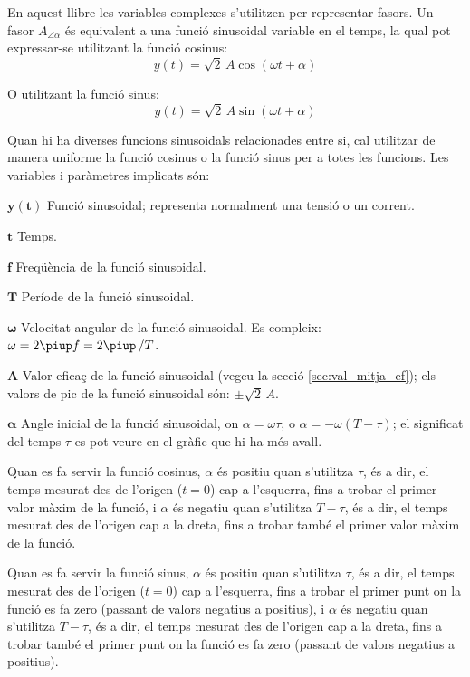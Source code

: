 \pagebreak

En aquest llibre les variables complexes s'utilitzen per representar fasors. Un fasor $A_{\angle \alpha}$ és equivalent a una funció sinusoidal variable en el temps, la qual pot expressar-se utilitzant la funció cosinus:
\[y(t)=\sqrt{2}\, A \cos(\omega t + \alpha)\]

O utilitzant la funció sinus:
\[y(t)=\sqrt{2}\, A \sin(\omega t + \alpha)\]

Quan hi ha diverses funcions sinusoidals relacionades entre si, cal utilitzar de manera uniforme la funció cosinus o la funció sinus per a totes les funcions. Les variables i paràmetres implicats són:
\begin{list}{}
{\setlength{\labelwidth}{15mm} \setlength{\leftmargin}{20mm}
\setlength{\labelsep}{5mm}}
    \item[$\boldsymbol{y(t)}$] Funció sinusoidal; representa normalment una tensió o un corrent.
    \item[$\boldsymbol{t}$] Temps.
    \item[$\boldsymbol{f}$] Freqüència de la funció sinusoidal.
    \item[$\boldsymbol{T}$] Període de la funció sinusoidal.
    \item[$\boldsymbol{\omega}$] Velocitat angular de la funció sinusoidal. Es compleix: $\omega = 2 \piup f = 2 \piup\,/T$.
    \item[$\boldsymbol{A}$] Valor eficaç de la funció sinusoidal (vegeu la secció \vref{sec:val_mitja_ef}); els valors de pic de la funció sinusoidal  són:  $\pm\sqrt{2}\, A$.
    \item[$\boldsymbol{\alpha}$] Angle inicial de la funció sinusoidal, on  $\alpha=\omega \tau$, o $\alpha=-\omega (T-\tau)$; el significat del temps $\tau$  es pot veure en el gràfic que hi ha més avall.

    Quan es fa servir la funció cosinus, $\alpha$ és positiu quan s'utilitza $\tau$, és a dir, el temps mesurat  des de l'origen ($t=0$) cap a l'esquerra, fins a trobar el primer valor màxim de la funció, i $\alpha$ és negatiu quan s'utilitza $T-\tau$, és a dir, el temps mesurat des de l'origen cap a la dreta, fins a trobar també el primer valor màxim de la funció.

    Quan es fa servir la funció sinus, $\alpha$ és positiu quan s'utilitza $\tau$, és a dir, el temps mesurat des de l'origen ($t=0$) cap a l'esquerra, fins a trobar el primer punt on la funció es fa zero (passant de valors negatius a positius), i $\alpha$ és negatiu quan s'utilitza $T-\tau$, és a dir, el temps mesurat des de l'origen cap a la dreta, fins a trobar també el primer punt on la funció es fa zero (passant de valors negatius a positius).
    \item[] 
\end{list}

